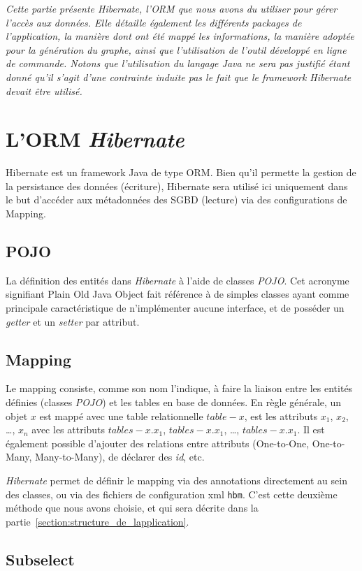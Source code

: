\textit{Cette partie présente \emph{Hibernate}, l'ORM que nous avons du utiliser pour gérer l'accès aux données. Elle détaille également les différents packages de l'application, la manière dont ont été mappé les informations, la manière adoptée pour la génération du graphe, ainsi que l'utilisation de l'outil développé en ligne de commande. Notons que l'utilisation du langage Java ne sera pas justifié étant donné qu'il s'agit d'une contrainte induite pas le fait que le framework \emph{Hibernate} devait être utilisé.}

\section{L'ORM \emph{Hibernate}}
Hibernate est un framework Java de type ORM. Bien qu'il permette la gestion de la persistance des données (écriture), Hibernate sera utilisé ici uniquement dans le but d'accéder aux métadonnées des SGBD (lecture) via des configurations de Mapping.
\subsection{POJO}
La définition des entités dans \emph{Hibernate} à l'aide de classes \emph{POJO}. Cet acronyme signifiant \og Plain Old Java Object \fg{} fait référence à de simples classes ayant comme principale caractéristique de n'implémenter aucune interface, et de posséder un \emph{getter} et un \emph{setter} par attribut.
\subsection{Mapping}
Le mapping consiste, comme son nom l'indique, à faire la liaison entre les entités définies (classes \emph{POJO}) et les tables en base de données. En règle générale, un objet $x$ est mappé avec une table relationnelle $table-x$, est les attributs $x_1$, $x_2$, \ldots, $x_n$ avec les attributs $tables-x.x_1$, $tables-x.x_1$, \ldots, $tables-x.x_1$. Il est également possible d'ajouter des relations entre attributs (One-to-One, One-to-Many, Many-to-Many), de déclarer des \emph{id}, etc.

\emph{Hibernate} permet de définir le mapping via des annotations directement au sein des classes, ou via des fichiers de configuration xml \texttt{hbm}. C'est cette deuxième méthode que nous avons choisie, et qui sera décrite dans la partie~\ref{section:structure_de_lapplication}.
\subsection{Subselect}

